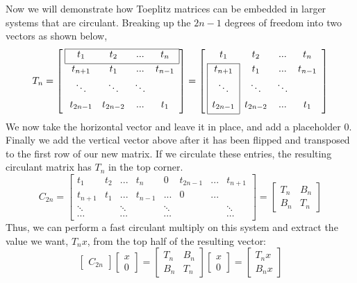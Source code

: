 	Now we will demonstrate how Toeplitz matrices can be embedded in larger systems that 
	are circulant. Breaking up the $2n-1$ degrees of freedom into two vectors as shown 
	below,
	$$
	T_{n} = \left[ \: 
	\begin{array}{*{4}{c}}
	\cline{1-4}
	\multicolumn{1}{|c}{t_{1}} & t_{2} & ...& \multicolumn{1}{c|}{t_{n}}           \\[0.3em]
	\cline{1-4}
	t_{n+1} & t_{1} & ... & t_{n-1} \\[0.3em]
	\ddots &\ddots & \ddots &    \\[0.3em]
	t_{2n-1} & t_{2n-2} & ... & t_{1}      \\[0.3em]    
	\end{array}
	\right]
	=
	\left[ \:
	\begin{array}{*{4}{c}}
	t_{1} & t_{2} & ...& t_{n}        \\[0.3em]
	\cline{1-1}
	\multicolumn{1}{|c|}{t_{n+1}} & t_{1} & ... & t_{n-1} \\[0.3em]
	\multicolumn{1}{|c|}{\ddots} & \ddots & \ddots &    \\[0.3em]
	\multicolumn{1}{|c|}{t_{2n-1}} & t_{2n-2} & ... & t_{1}          \\[0.3em]
	\cline{1-1}
	\end{array}
	\right]
	$$
	We now take the horizontal vector and leave it in place, and add a placeholder $0$. 
	Finally we add the vertical vector above after it has been flipped and transposed to 
	the first row of our new matrix. If we circulate these entries, the resulting circulant
	matrix has $T_n$ in the top corner. 
	$$
	C_{2n} =\begin{bmatrix}
	t_{1}   & t_{2} & ...    & t_{n}  & 0   & t_{2n-1} & ... &  t_{n+1}   \\[0.3em]
	t_{n+1} & t_{1} & ...    & t_{n-1}& ... & 0  & ... &          \\[0.3em]
	\ddots  &       & \ddots &        & \ddots & & &\ddots    \\[0.3em]
	\cdots  &       & \cdots &       & \cdots & & & \cdots
	\end{bmatrix}
	=
	\begin{bmatrix}
	T_{n} & B_{n}            \\[0.3em]
	B_{n} & T_{n}   
	\end{bmatrix}
	$$	
	Thus, we can perform a fast circulant multiply on this system and extract the value we
	want, $T_n x$, from the top half of the resulting vector:
	$$
	\begin{bmatrix} C_{2n} 
	\end{bmatrix} 
	\begin{bmatrix} x \\[0.3em] 0 \end{bmatrix} =
	\begin{bmatrix}
	T_{n} & B_{n}            \\[0.3em]
	B_{n} & T_{n}   
\end{bmatrix} \begin{bmatrix} x \\[0.3em] 0 \end{bmatrix}
= \begin{bmatrix} T_n x \\[0.3em] B_n x \end{bmatrix}
 $$

